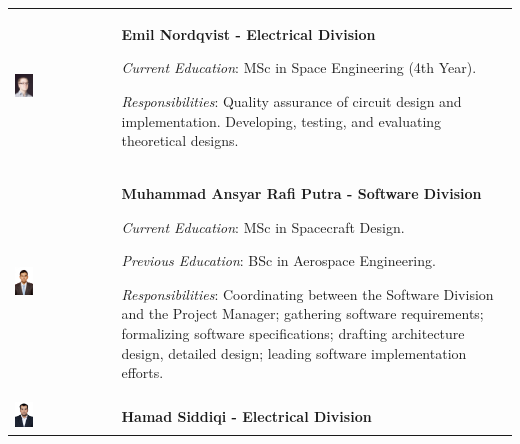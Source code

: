 \documentclass[a4paper,12pt,twoside]{article}
\begin{document}
\begin{longtable}[]{m{} m{}}
\includegraphics[width=0.2\textwidth]{1-introduction/img/emil-nordqvist.jpg} & \textbf{Emil Nordqvist - Electrical Division}

\smallskip
\textit{Current Education}: MSc in Space Engineering (4th Year).

\smallskip
\textit{Responsibilities}: Quality assurance of circuit design and implementation. Developing, testing, and evaluating theoretical designs.  \bigskip
\\

\includegraphics[width=0.2\textwidth]{1-introduction/img/muhammad-ansyar-rafi-putra.jpg} & \textbf{Muhammad Ansyar Rafi Putra - Software Division}

\smallskip
\textit{Current Education}: MSc in Spacecraft Design.

\smallskip
\textit{Previous Education}: BSc in Aerospace Engineering.


\smallskip 
\textit{Responsibilities}: Coordinating between the Software Division and the Project Manager; gathering software requirements; formalizing software specifications; drafting architecture design, detailed design; leading software implementation efforts.
\bigskip
\\

\includegraphics[width=0.2\textwidth]{1-introduction/img/hamad-saddiqi.jpg} & \textbf{Hamad Siddiqi - Electrical Division}



\end{longtable}
\end{document}
